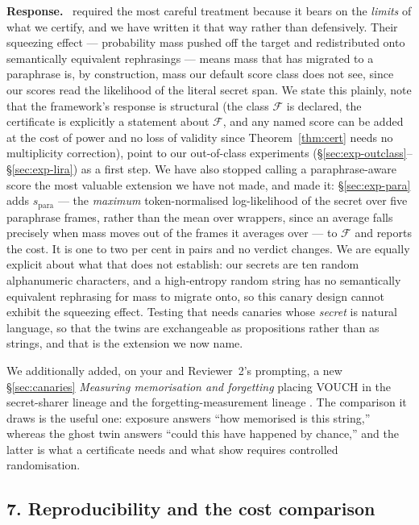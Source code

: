 \documentclass[11pt,a4paper]{article}
\newcommand{\F}{\mathcal{F}}
\newenvironment{reply}{%
  \par\smallskip\noindent\textbf{\color{acol}Response.}\ \begingroup}{\endgroup\par}
\begin{document}
\begin{reply}
\citet{li2026beliefs} required the most careful treatment because it bears on the
\emph{limits} of what we certify, and we have written it that way rather than
defensively. Their squeezing effect --- probability mass pushed off the target and
redistributed onto semantically equivalent rephrasings --- means mass that has migrated
to a paraphrase is, by construction, mass our default score class does not see, since
our scores read the likelihood of the literal secret span. We state this plainly, note
that the framework's response is structural (the class $\F$ is declared, the
certificate is explicitly a statement about $\F$, and any named score can be added at
the cost of power and no loss of validity since Theorem~\ref{thm:cert} needs no multiplicity
correction), point to our out-of-class experiments (\S\ref{sec:exp-outclass}--\S\ref{sec:exp-lira}) as a first step. We have
also stopped calling a paraphrase-aware score the most valuable extension we have not
made, and made it: \S\ref{sec:exp-para} adds $s_{\mathrm{para}}$ --- the \emph{maximum}
token-normalised log-likelihood of the secret over five paraphrase frames, rather than
the mean over wrappers, since an average falls precisely when mass moves out of the
frames it averages over --- to $\F$ and reports the cost. It is one to two per cent in
pairs and no verdict changes. We are equally explicit about what that does not
establish: our secrets are ten random alphanumeric characters, and a high-entropy
random string has no semantically equivalent rephrasing for mass to migrate onto, so
this canary design cannot exhibit the squeezing effect. Testing that needs canaries
whose \emph{secret} is natural language, so that the twins are exchangeable as
propositions rather than as strings, and that is the extension we now name.

We additionally added, on your and Reviewer~2's prompting, a new \S\ref{sec:canaries}
\emph{Measuring memorisation and forgetting} placing VOUCH in the secret-sharer lineage
\citep{carlini2019secret} and the forgetting-measurement lineage
\citep{jagielski2023measuring}. The comparison it draws is the useful one:
exposure answers ``how memorised is this string,'' whereas the ghost
twin answers ``could this have happened by chance,'' and the latter is what a
certificate needs and what \citet{zhang2024mia} show requires controlled randomisation.
\end{reply}

\subsection*{7. Reproducibility and the cost comparison}
\end{document}
